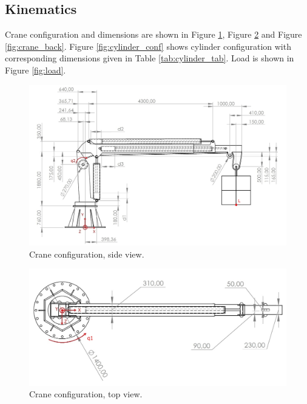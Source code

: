 \documentclass{article}
\begin{document}
	\subsection{Kinematics}
	
	Crane configuration and dimensions are shown in Figure \ref{fig:crane_side}, Figure \ref{fig:crane_top} and Figure \ref{fig:crane_back}. Figure \ref{fig:cylinder_conf} shows cylinder configuration with corresponding dimensions given in Table \ref{tab:cylinder_tab}. Load is shown in Figure \ref{fig:load}.
	
	\begin{figure}[h!]
		\centering
		\includegraphics[width=\textwidth]{kran_bokocrt.jpg}
		\caption{Crane configuration, side view.}
		\label{fig:crane_side}
	\end{figure}
	
	\begin{figure}[h!]
		\centering
		\includegraphics[width=\textwidth]{kran_tlocrt.jpg}
		\caption{Crane configuration, top view.}
		\label{fig:crane_top}
	\end{figure}
	
\end{document}
